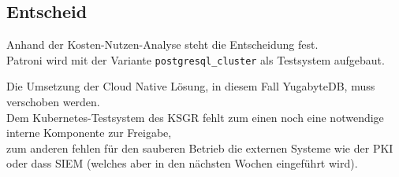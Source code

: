 
\begin{flushleft}
    \subsection{Entscheid}
    Anhand der Kosten-Nutzen-Analyse steht die Entscheidung fest.\\
    Patroni wird mit der Variante \texttt{postgresql\_cluster} als Testsystem aufgebaut.
\end{flushleft}
\begin{flushleft}
    Die Umsetzung der Cloud Native Lösung, in diesem Fall YugabyteDB, muss verschoben werden.\\
    Dem \Gls{Kubernetes}-Testsystem des KSGR fehlt zum einen noch eine notwendige interne Komponente zur Freigabe,\\
    zum anderen fehlen für den sauberen Betrieb die externen Systeme wie der \Gls{PKI} oder dass \Gls{SIEM} (welches aber in den nächsten Wochen eingeführt wird).
\end{flushleft}